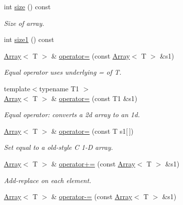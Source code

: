\begin{DoxyCompactItemize}
int \mbox{\hyperlink{classXMLArray_1_1Array_ab59904c2aa0e31c18c6cd5f5a186e292}{size}} () const
\begin{DoxyCompactList}\small\item\em Size of array. \end{DoxyCompactList}\item 
int \mbox{\hyperlink{classXMLArray_1_1Array_a33e863988af56d045439d31058088c8c}{size1}} () const
\item 
\mbox{\hyperlink{classXMLArray_1_1Array}{Array}}$<$ T $>$ \& \mbox{\hyperlink{classXMLArray_1_1Array_a99fd481573c47ab9a9e35ed597575b0e}{operator=}} (const \mbox{\hyperlink{classXMLArray_1_1Array}{Array}}$<$ T $>$ \&s1)
\begin{DoxyCompactList}\small\item\em Equal operator uses underlying = of T. \end{DoxyCompactList}\item 
{\footnotesize template$<$typename T1 $>$ }\\\mbox{\hyperlink{classXMLArray_1_1Array}{Array}}$<$ T $>$ \& \mbox{\hyperlink{classXMLArray_1_1Array_a3051ecb95c6d07f9ad80e72a2fd50c61}{operator=}} (const T1 \&s1)
\begin{DoxyCompactList}\small\item\em Equal operator\+: converts a 2d array to an 1d. \end{DoxyCompactList}\item 
\mbox{\hyperlink{classXMLArray_1_1Array}{Array}}$<$ T $>$ \& \mbox{\hyperlink{classXMLArray_1_1Array_a73e85fb91d2c802400fa356bc3ce77e1}{operator=}} (const T s1\mbox{[}$\,$\mbox{]})
\begin{DoxyCompactList}\small\item\em Set equal to a old-\/style C 1-\/D array. \end{DoxyCompactList}\item 
\mbox{\hyperlink{classXMLArray_1_1Array}{Array}}$<$ T $>$ \& \mbox{\hyperlink{classXMLArray_1_1Array_ab8a6046aa7dbc0b3c43e4479b1eaf004}{operator+=}} (const \mbox{\hyperlink{classXMLArray_1_1Array}{Array}}$<$ T $>$ \&s1)
\begin{DoxyCompactList}\small\item\em Add-\/replace on each element. \end{DoxyCompactList}\item 
\mbox{\hyperlink{classXMLArray_1_1Array}{Array}}$<$ T $>$ \& \mbox{\hyperlink{classXMLArray_1_1Array_aa92c6d59ed6a656c3004db85bd67c192}{operator-\/=}} (const \mbox{\hyperlink{classXMLArray_1_1Array}{Array}}$<$ T $>$ \&s1)

\end{DoxyCompactItemize}
